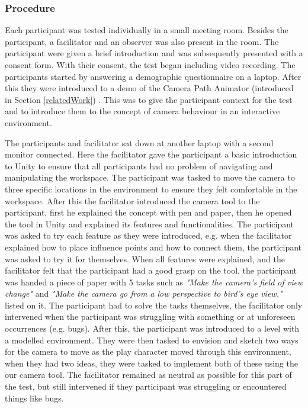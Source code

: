 \subsubsection{Procedure}
Each participant was tested individually in a small meeting room. Besides the participant, a facilitator and an observer was also present in the room. The participant were given a brief introduction and was subsequently presented with a consent form. With their consent, the test began including video recording. The participants started by answering a demographic questionnaire on a laptop. After this they were introduced to a demo of the Camera Path Animator (introduced in Section \ref{relatedWork}) \cite{unity_camTool}. This was to give the participant context for the test and to introduce them to the concept of camera behaviour in an interactive environment. 

The participants and facilitator sat down at another laptop with a second monitor connected. Here the facilitator gave the participant a basic introduction to Unity to ensure that all participants had no problem of navigating and manipulating the workspace. The participant was tasked to move the camera to three specific locations in the environment to ensure they felt comfortable in the workspace. After this the facilitator introduced the camera tool to the participant, first he explained the concept with pen and paper, then he opened the tool in Unity and explained its features and functionalities. The participant was asked to try each feature as they were introduced, e.g. when the facilitator explained how to place influence points and how to connect them, the participant was asked to try it for themselves. When all features were explained, and the facilitator felt that the participant had a good grasp on the tool, the participant was handed a piece of paper with 5 tasks such as \textit{"Make the camera's field of view change"} and \textit{"Make the camera go from a low perspective to bird's eye view."} listed on it. The participant had to solve the tasks themselves, the facilitator only intervened when the participant was struggling with something or at unforeseen occurrences (e.g. bugs). After this, the participant was introduced to a level with a modelled environment. They were then tasked to envision and sketch two ways for the camera to move as the play character moved through this environment, when they had two ideas, they were tasked to implement both of these using the our camera tool. The facilitator remained as neutral as possible for this part of the test, but still intervened if they participant was struggling or encountered things like bugs.

